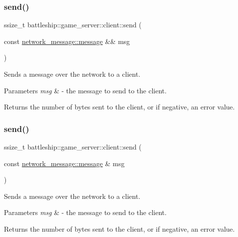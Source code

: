 \subsubsection{\texorpdfstring{send()}{send()}\hspace{0.1cm}{\footnotesize\ttfamily [2/3]}}
{\footnotesize\ttfamily ssize\+\_\+t battleship\+::game\+\_\+server\+::client\+::send (\begin{DoxyParamCaption}\item[{const \hyperlink{classbattleship_1_1network__message_1_1message}{network\+\_\+message\+::message} \&\&}]{msg }\end{DoxyParamCaption})\hspace{0.3cm}{\ttfamily [inline]}}

Sends a message over the network to a client.


\begin{DoxyParams}{Parameters}
{\em msg} & -\/ the message to send to the client.\\
\hline
\end{DoxyParams}
\begin{DoxyReturn}{Returns}
the number of bytes sent to the client, or if negative, an error value. 
\end{DoxyReturn}
\mbox{\label{classbattleship_1_1game__server_1_1client_a1aec51b5386354c5acd2b7a45486f7cc}} 
\subsubsection{\texorpdfstring{send()}{send()}\hspace{0.1cm}{\footnotesize\ttfamily [3/3]}}
{\footnotesize\ttfamily ssize\+\_\+t battleship\+::game\+\_\+server\+::client\+::send (\begin{DoxyParamCaption}\item[{const \hyperlink{classbattleship_1_1network__message_1_1message}{network\+\_\+message\+::message} \&}]{msg }\end{DoxyParamCaption})\hspace{0.3cm}{\ttfamily [inline]}}

Sends a message over the network to a client.


\begin{DoxyParams}{Parameters}
{\em msg} & -\/ the message to send to the client.\\
\hline
\end{DoxyParams}
\begin{DoxyReturn}{Returns}
the number of bytes sent to the client, or if negative, an error value. 
\end{DoxyReturn}
\mbox{\label{classbattleship_1_1game__server_1_1client_a106984508ae941fa5a88dbe066214ad4}} 
